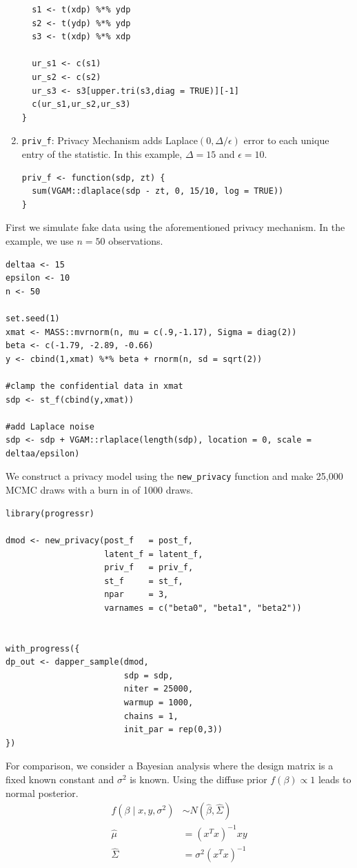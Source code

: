 \begin{enumerate}
\begin{verbatim}
  s1 <- t(xdp) %*% ydp
  s2 <- t(ydp) %*% ydp
  s3 <- t(xdp) %*% xdp

  ur_s1 <- c(s1)
  ur_s2 <- c(s2)
  ur_s3 <- s3[upper.tri(s3,diag = TRUE)][-1]
  c(ur_s1,ur_s2,ur_s3)
}
\end{verbatim}
\item
  \texttt{priv\_f}: Privacy Mechanism
  adds Laplace\((0, \Delta/\epsilon)\) error to each unique entry
  of the statistic. In this example, \(\Delta = 15\) and \(\epsilon = 10\).

\begin{verbatim}
priv_f <- function(sdp, zt) {
  sum(VGAM::dlaplace(sdp - zt, 0, 15/10, log = TRUE))
}
\end{verbatim}
\end{enumerate}

First we simulate fake data using the aforementioned privacy mechanism.
In the example, we use \(n = 50\) observations.

\begin{verbatim}
deltaa <- 15
epsilon <- 10
n <- 50

set.seed(1)
xmat <- MASS::mvrnorm(n, mu = c(.9,-1.17), Sigma = diag(2))
beta <- c(-1.79, -2.89, -0.66)
y <- cbind(1,xmat) %*% beta + rnorm(n, sd = sqrt(2))

#clamp the confidential data in xmat
sdp <- st_f(cbind(y,xmat))

#add Laplace noise 
sdp <- sdp + VGAM::rlaplace(length(sdp), location = 0, scale = deltaa/epsilon)
\end{verbatim}

We construct a privacy model using the \texttt{new\_privacy} function and
make 25,000 MCMC draws with a burn in of 1000 draws.

\begin{verbatim}
library(progressr)

dmod <- new_privacy(post_f   = post_f,
                    latent_f = latent_f,
                    priv_f   = priv_f,
                    st_f     = st_f,
                    npar     = 3,
                    varnames = c("beta0", "beta1", "beta2"))


with_progress({
dp_out <- dapper_sample(dmod,
                        sdp = sdp,
                        niter = 25000,
                        warmup = 1000,
                        chains = 1,
                        init_par = rep(0,3))
})
\end{verbatim}

For comparison, we consider a Bayesian analysis where the design matrix
is a fixed known constant and \(\sigma^2\) is known. Using the
diffuse prior \(f(\beta) \propto 1\) leads to normal posterior.
\[
\begin{aligned}
f(\beta \mid x,y, \sigma^2) &\sim N(\hat{\beta}, \hat{\Sigma})\\
\hat{\mu} &= (x^Tx)^{-1}xy\\
\hat{\Sigma} &= \sigma^{2}(x^Tx)^{-1}
\end{aligned}
\]


